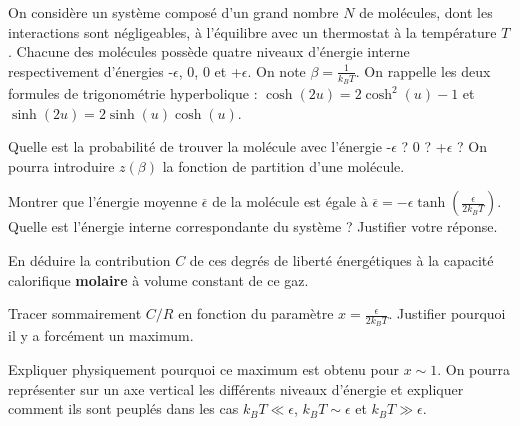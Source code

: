 On considère un système composé d'un grand nombre $N$ de molécules, dont les interactions sont négligeables, à l'équilibre avec un thermostat à la température $T$. Chacune des molécules possède quatre niveaux d'énergie \og interne \fg \, respectivement d'énergies -$\epsilon$, 0, 0 et  +$\epsilon$. On note $\beta=\frac{1}{k_B T}$. On rappelle les deux formules de trigonométrie hyperbolique : $\cosh(2u)=2 \cosh^2(u)-1$ et $\sinh(2u)=2 \sinh(u)\cosh(u)$.

\question
Quelle est la probabilité de trouver la molécule avec l'énergie -$\epsilon$ ? 0 ? +$\epsilon$ ? On pourra introduire $z(\beta)$ la fonction de partition d'une molécule.

\question
Montrer que l'énergie  moyenne $\overline{\epsilon}$ de la molécule est égale à $\overline{\epsilon}=- \epsilon \tanh ( \frac{\epsilon}{2k_BT})$. Quelle est l'énergie interne correspondante du système  ? Justifier votre réponse.

\question
En déduire la contribution $C$ de ces degrés de liberté énergétiques à la capacité calorifique \textbf{molaire} à volume constant de ce gaz.

\question
Tracer sommairement $C/R$ en fonction du paramètre $x=\frac{\epsilon}{2k_BT}$. Justifier pourquoi il y a forcément un maximum.

\question
Expliquer physiquement pourquoi ce maximum est obtenu pour $x \sim 1$. On pourra représenter sur un axe vertical les différents niveaux d'énergie et expliquer comment ils sont peuplés  dans les cas $k_BT \ll \epsilon$, $k_BT \sim \epsilon$ et $k_BT \gg \epsilon$.
